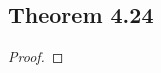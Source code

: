 \documentclass[../../main.tex]{subfiles}
\begin{document}
\subsection{Theorem 4.24}
\begin{wts}

\end{wts}
\begin{proof}

\end{proof}
\end{document}
